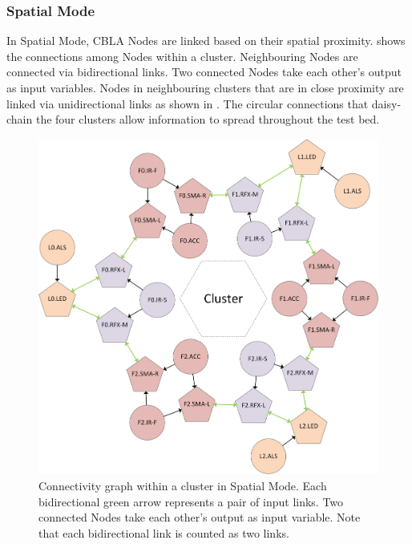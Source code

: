 \subsubsection{Spatial Mode}

In Spatial Mode, CBLA Nodes are linked based on their spatial proximity.  shows the connections among Nodes within a cluster. Neighbouring Nodes are connected via bidirectional links. Two connected Nodes take each other's output as input variables. Nodes in neighbouring clusters that are in close proximity are linked via unidirectional links as shown in . The circular connections that daisy-chain the four clusters allow information to spread throughout the test bed. 

\begin{figure} [!htbp]
	\centering
	\includegraphics[width=1.0\textwidth]{"fig/validations/Spatial Local Mode"}
	\caption[Connectivity graph within a cluster in Spatial Mode]{Connectivity graph within a cluster in Spatial Mode. Each bidirectional green arrow represents a pair of input links. Two connected Nodes take each other's output as input variable. Note that each bidirectional link is counted as two links.}
	\label{fig:Spatial Local Modes}
\end{figure}


